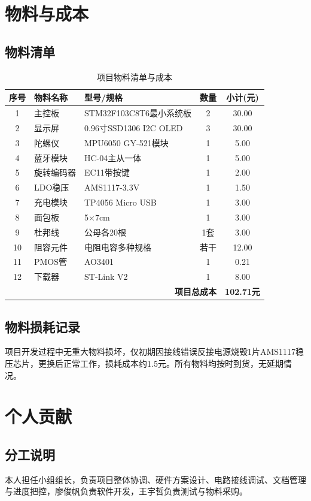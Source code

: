\documentclass[12pt, a4paper]{ctexart}
\begin{document}
\section{物料与成本}
\subsection{物料清单}
\begin{table}[htbp]
\centering
\caption{项目物料清单与成本}
\label{tab:bom}
\begin{tabular}{cllcc}
\toprule
序号 & 物料名称 & 型号/规格 & 数量 & 小计(元) \\
\midrule
1 & 主控板 & STM32F103C8T6最小系统板 & 2 & 30.00 \\
2 & 显示屏 & 0.96寸SSD1306 I2C OLED & 3 & 30.00 \\
3 & 陀螺仪 & MPU6050 GY-521模块 & 1 & 5.00 \\
4 & 蓝牙模块 & HC-04主从一体 & 1 & 5.00 \\
5 & 旋转编码器 & EC11带按键 & 1 & 2.00 \\
6 & LDO稳压 & AMS1117-3.3V & 1 & 1.50 \\
7 & 充电模块 & TP4056 Micro USB & 1 & 3.00 \\
8 & 面包板 & 5×7cm & 1 & 3.00 \\
9 & 杜邦线 & 公母各20根 & 1套 & 3.00 \\
10 & 阻容元件 & 电阻电容多种规格 & 若干 & 12.00 \\
11 & PMOS管 & AO3401 & 1 & 0.21 \\
12 & 下载器 & ST-Link V2 & 1 & 8.00 \\
\midrule
\multicolumn{4}{r}{\textbf{项目总成本}} & \textbf{102.71元} \\
\bottomrule
\end{tabular}
\end{table}

\subsection{物料损耗记录}
项目开发过程中无重大物料损坏，仅初期因接线错误反接电源烧毁1片AMS1117稳压芯片，更换后正常工作，损耗成本约1.5元。所有物料均按时到货，无延期情况。

\section{个人贡献}
\subsection{分工说明}
本人担任小组组长，负责项目整体协调、硬件方案设计、电路接线调试、文档管理与进度把控，廖俊帆负责软件开发，王宇哲负责测试与物料采购。
\end{document}
